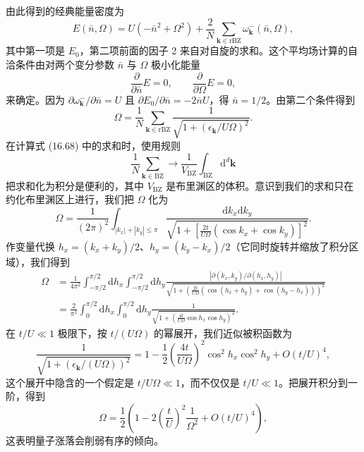 由此得到的经典能量密度为
\begin{equation*}
E(\bar{n},\Omega)=U(-\bar{n}^{2}+\Omega^{2})+\frac{2}{N}\sum_{\mathbf{k}\in \mathrm{rBZ}}\omega^{-}_{\mathbf{k}}(\bar{n},\Omega),\tag{16.66}
\end{equation*}
其中第一项是 $E_{0}$，第二项前面的因子 2 来自对自旋的求和。这个平均场计算的自洽条件由对两个变分参数 $\bar{n}$ 与 $\Omega$ 极小化能量
\begin{equation*}
\frac{\partial}{\partial\bar{n}}E=0,\qquad\frac{\partial}{\partial\Omega}E=0,\tag{16.67}
\end{equation*}
来确定。因为 $\partial\omega^{-}_{\mathbf{k}}/\partial\bar{n}=U$ 且 $\partial E_{0}/\partial\bar{n}=-2\bar{n}U$，得 $\bar{n}=1/2$。由第二个条件得到
\begin{equation*}
\Omega=\frac{1}{N}\sum_{\mathbf{k}\in \mathrm{rBZ}}\frac{1}{\sqrt{1+(\epsilon_{\mathbf{k}}/U\Omega)^{2}}}.\tag{16.68}
\end{equation*}
在计算式 (16.68) 中的求和时，使用规则
\begin{equation*}
\frac{1}{N}\sum_{\mathbf{k}\in \mathrm{BZ}}\to\frac{1}{V_{\mathrm{BZ}}}\int_{\mathrm{BZ}}\mathrm{d}^{d}\mathbf{k}\tag{16.69}
\end{equation*}
把求和化为积分是便利的，其中 $V_{\mathrm{BZ}}$ 是布里渊区的体积。意识到我们的求和只在约化布里渊区上进行，我们把 $\Omega$ 化为
\begin{equation*}
\Omega=\frac{1}{(2\pi)^{2}}\int_{|k_{x}|+|k_{y}|\le\pi}\frac{\mathrm{d}k_{x}\mathrm{d}k_{y}}{\sqrt{1+\left[\frac{2t}{U\Omega}(\cos k_{x}+\cos k_{y})\right]^{2}}}.\tag{16.70}
\end{equation*}
作变量代换 $h_{x}=(k_{x}+k_{y})/2$、$h_{y}=(k_{y}-k_{x})/2$（它同时旋转并缩放了积分区域），我们得到
\begin{align*}
\Omega&=\frac{1}{4\pi^{2}}\int_{-\pi/2}^{\pi/2}\mathrm{d}h_{x}\int_{-\pi/2}^{\pi/2}\mathrm{d}h_{y}\frac{|\partial(k_{x},k_{y})/\partial(h_{x},h_{y})|}{\sqrt{1+\left(\frac{2t}{U\Omega}\left(\cos(h_{x}+h_{y})+\cos(h_{y}-h_{x})\right)\right)^{2}}}\\
&=\frac{2}{\pi^{2}}\int_{0}^{\pi/2}\mathrm{d}h_{x}\int_{0}^{\pi/2}\mathrm{d}h_{y}\frac{1}{\sqrt{1+\left(\frac{4t}{U\Omega}\cos h_{x}\cos h_{y}\right)^{2}}}.\tag{16.71}
\end{align*}
在 $t/U\ll 1$ 极限下，按 $t/(U\Omega)$ 的幂展开，我们近似被积函数为
\begin{equation*}
\frac{1}{\sqrt{1+(\epsilon_{\mathbf{k}}/(U\Omega))^{2}}}=1-\frac{1}{2}\left(\frac{4t}{U\Omega}\right)^{2}\cos^{2}h_{x}\cos^{2}h_{y}+O(t/U)^{4},\tag{16.72}
\end{equation*}
这个展开中隐含的一个假定是 $t/U\Omega\ll 1$，而不仅仅是 $t/U\ll 1$。把展开积分到一阶，得到
\begin{equation*}
\Omega=\frac{1}{2}\left(1-2\left(\frac{t}{U}\right)^{2}\frac{1}{\Omega^{2}}+O(t/U)^{4}\right),\tag{16.73}
\end{equation*}
这表明量子涨落会削弱有序的倾向。

